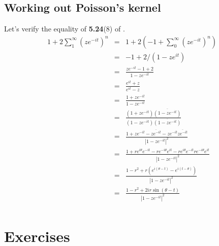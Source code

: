\subsection{Working out Poisson's kernel}


Let's verify the equality of \textbf{5.24}(8) of \cite{RudinRCA80}.
\begin{eqnarray*}
1+2\sum_1^\infty \left(ze^{-it}\right)^n
&=& 1 + 2\left(-1 + \sum_0^\infty \left(ze^{-it}\right)^n\right) \\
&=& -1 + 2/\left(1 - ze^{it}\right) \\
&=& \frac{ze^{-it} - 1 + 2}{1 - ze^{-it}} \\
&=& \frac{e^{it} + z}{e^{it} - z} \\
&=& \frac{1 + ze^{-it}}{1 - ze^{-it}} \\
&=& \frac{ (1 + ze^{-it})\overline{(1 - ze^{-it}) } }{
           (1 - ze^{-it})\overline{(1 - ze^{-it}) } } \\
&=& \frac{ 1 + ze^{-it} - \overline{ze^{-it}} - ze^{-it}\overline{ze^{-it}} }{
           |1 - ze^{-it}|^2 } \\
&=& \frac{ 1 + re^{i\theta}e^{-it} - re^{-i\theta}e^{it}
             - re^{i\theta}e^{-it}re^{-i\theta}e^{it} }{
           |1 - ze^{-it}|^2 } \\
&=& \frac{ 1 - r^2 + r\left(e^{i(\theta-t)} - e^{i(t-\theta)}\right)
         }{ |1 - ze^{-it}|^2 } \\
&=& \frac{ 1 - r^2 + 2ir\sin(\theta-t) }{ |1 - ze^{-it}|^2 } \\
\end{eqnarray*}


\section{Exercises} %

